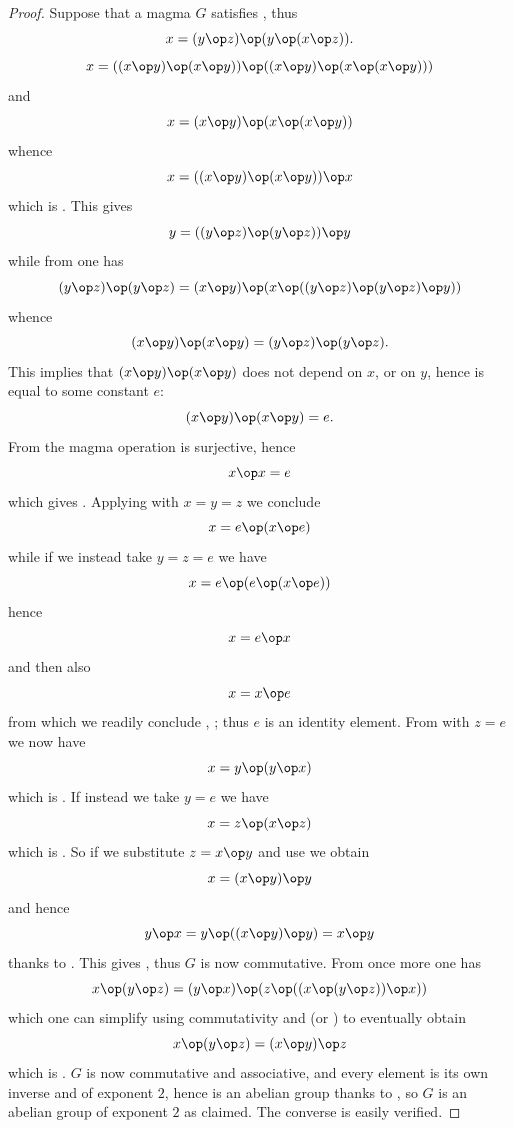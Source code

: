 \begin{proof}\leanok  Suppose that a magma $G$ satisfies , thus
\begin{equation}\label{1571-again}
 x = (y \op z) \op (y \op (x \op z)).
\end{equation}
$$ x = ((x \op y) \op (x \op y)) \op ((x \op y) \op (x \op (x \op y)))$$
and
$$ x = (x \op y) \op (x \op (x \op y))$$
whence
$$x = ((x \op y) \op (x \op y)) \op x$$
which is .  This gives
$$y = ((y \op z) \op (y \op z)) \op y$$
while from  one has
$$ (y \op z) \op (y \op z) = (x \op y) \op (x \op ((y \op z) \op (y \op z) \op y))$$
whence
$$ (x \op y) \op (x \op y) = (y \op z) \op (y \op z).$$
This implies that $(x \op y) \op (x \op y)$ does not depend on $x$, or on $y$, hence is equal to some constant $e$:
$$ (x \op y) \op (x \op y) = e.$$
From  the magma operation is surjective, hence
\begin{equation}\label{xxe} x \op x = e
\end{equation}
which gives .  Applying  with $x=y=z$ we conclude
$$ x = e \op (x \op e)$$
while if we instead take $y=z=e$ we have
$$ x = e \op (e \op (x \op e))$$
hence
$$ x = e \op x$$
and then also
$$ x = x \op e$$
from which we readily conclude , ; thus $e$ is an identity element.  From  with $z=e$ we now have
\begin{equation}\label{16-again}
 x = y \op (y \op x)
\end{equation}
which is . If instead we take $y=e$ we have
\begin{equation}\label{14-again}
  x = z \op (x \op z)
\end{equation}
which is .  So if we substitute $z = x \op y$ and use  we obtain
$$ x = (x \op y) \op y$$
and hence
$$ y \op x = y \op ((x \op y) \op y) = x \op y$$
thanks to .  This gives , thus $G$ is now commutative.  From  once more one has
$$x \op (y \op z) = (y \op x) \op (z \op ((x \op (y \op z)) \op x))$$
which one can simplify using commutativity and  (or ) to eventually obtain
$$x \op (y \op z) = (x \op y) \op z$$
which is .  $G$ is now commutative and associative, and every element is its own inverse and of exponent $2$, hence is an abelian group thanks to , so $G$ is an abelian group of exponent $2$ as claimed.  The converse is easily verified.
\end{proof}

